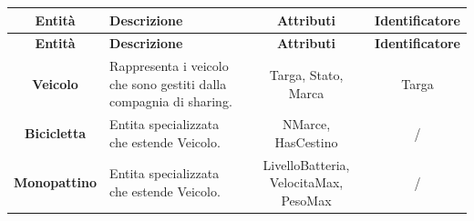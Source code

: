 \documentclass[11pt,a4paper]{article}
\begin{document}
\begin{tabularx}{\linewidth}{| C{0.85} | L{1.10} | C{0.95} | C{0.90} |}
    \hline
    \textbf{Entità}                                                                                                         & \textbf{Descrizione} & \textbf{Attributi} & \textbf{Identificatore} \\ \hline
    \endfirsthead

    \hline
    \textbf{Entità}                                                                                                         & \textbf{Descrizione} & \textbf{Attributi} & \textbf{Identificatore} \\ \hline
    \endhead

    \textbf{Veicolo}                                                                                                        &
    Rappresenta i veicolo che sono gestiti dalla compagnia di sharing.                                                      &
    Targa, Stato, Marca                                                                                                     &
    Targa                                                                                                                                                                                         \\ \hline

    \textbf{Bicicletta}                                                                                                     &
    Entita specializzata che estende Veicolo.                                                                               &
    NMarce, HasCestino                                                                                                      &
    /                                                                                                                                                                                             \\ \hline

    \textbf{Monopattino}                                                                                                    &
    Entita specializzata che estende Veicolo.                                                                               &
    LivelloBatteria, VelocitaMax, PesoMax                                                                                   &
    /                                                                                                                                                                                             \\ \hline


\end{tabularx}
\end{document}
